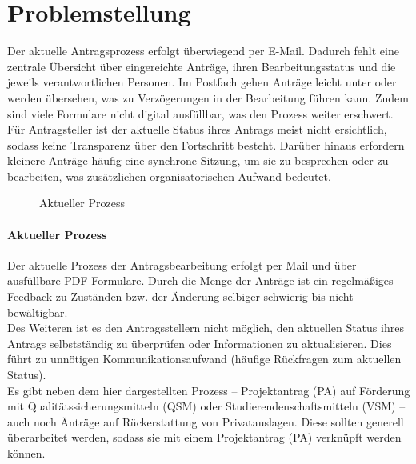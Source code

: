 \chapter{Problemstellung}

Der aktuelle Antragsprozess erfolgt überwiegend per E-Mail. Dadurch fehlt eine zentrale Übersicht über eingereichte Anträge, ihren Bearbeitungsstatus und die jeweils verantwortlichen Personen. Im Postfach gehen Anträge leicht unter oder werden übersehen, was zu Verzögerungen in der Bearbeitung führen kann. Zudem sind viele Formulare nicht digital ausfüllbar, was den Prozess weiter erschwert. Für Antragsteller ist der aktuelle Status ihres Antrags meist nicht ersichtlich, sodass keine Transparenz über den Fortschritt besteht. Darüber hinaus erfordern kleinere Anträge häufig eine synchrone Sitzung, um sie zu besprechen oder zu bearbeiten, was zusätzlichen organisatorischen Aufwand bedeutet.

\begin{multicols}{2}
    \begin{figure}[H]
        \centering
        
        \caption{Aktueller Prozess}
        \label{fig:aktuelle_prozesse}
    \end{figure}

    \columnbreak

    \subsubsection{Aktueller Prozess}

    Der aktuelle Prozess der Antragsbearbeitung erfolgt per Mail und über ausfüllbare PDF-Formulare.
    Durch die Menge der Anträge ist ein regelmäßiges Feedback zu Zuständen bzw. der Änderung selbiger schwierig bis nicht bewältigbar.\\

    Des Weiteren ist es den Antragsstellern nicht möglich, den aktuellen Status ihres Antrags selbstständig zu überprüfen oder Informationen zu aktualisieren.
    Dies führt zu unnötigen Kommunikationsaufwand (häufige Rückfragen zum aktuellen Status).\\

    Es gibt neben dem hier dargestellten Prozess – Projektantrag (PA) auf Förderung mit Qualitätssicherungsmitteln (QSM) oder Studierendenschaftsmitteln (VSM) – auch noch Änträge auf Rückerstattung von Privatauslagen.
    Diese sollten generell überarbeitet werden, sodass sie mit einem Projektantrag (PA) verknüpft werden können.
\end{multicols}

